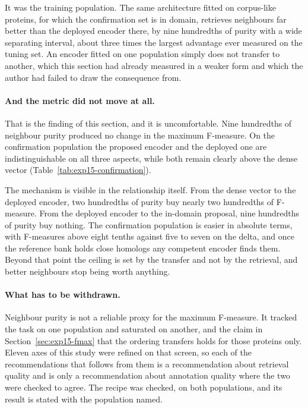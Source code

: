 It was the training population. The same architecture fitted on corpus-like proteins,
for which the confirmation set is in domain, retrieves neighbours far better than the
deployed encoder there, by nine hundredths of purity with a wide separating interval,
about three times the largest advantage ever measured on the tuning set. An encoder
fitted on one population simply does not transfer to another, which this section had
already measured in a weaker form and which the author had failed to draw the
consequence from.

\paragraph{And the metric did not move at all.} That is the finding of this section,
and it is uncomfortable. Nine hundredths of neighbour purity produced no change in the
maximum F-measure. On the confirmation population the proposed encoder and the
deployed one are indistinguishable on all three aspects, while both remain clearly
above the dense vector (Table~\ref{tab:exp15-confirmation}).

\begin{table}[htbp]
  \centering
  \caption{Maximum F-measure on two populations: the evaluation delta this section
  was developed on, and a confirmation set drawn from the general corpus that no arm
  had seen. Intervals are paired bootstrap draws with the measure recomputed on each.}
  \label{tab:exp15-confirmation}
  
\end{table}

The mechanism is visible in the relationship itself. From the dense vector to the
deployed encoder, two hundredths of purity buy nearly two hundredths of F-measure. From
the deployed encoder to the in-domain proposal, nine hundredths of purity buy nothing.
The confirmation population is easier in absolute terms, with F-measures above eight
tenths against five to seven on the delta, and once the reference bank holds close
homologs any competent encoder finds them. Beyond that point the ceiling is set by the
transfer and not by the retrieval, and better neighbours stop being worth anything.

\paragraph{What has to be withdrawn.} Neighbour purity is not a reliable proxy for the
maximum F-measure. It tracked the task on one population and saturated on another, and
the claim in Section~\ref{sec:exp15-fmax} that the ordering transfers holds for those
proteins only. Eleven axes of this study were refined on that screen, so each of the
recommendations that follows from them is a recommendation about retrieval quality and
is only a recommendation about annotation quality where the two were checked to agree.
The recipe was checked, on both populations, and its result is stated with the
population named.

